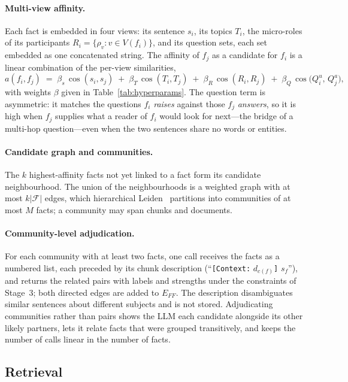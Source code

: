 \documentclass[runningheads]{llncs}
\newcommand{\Fset}{\mathcal{F}}
\newcommand{\Eff}{E_{FF}}
\newcommand{\cosim}{\operatorname{cos}}
\begin{document}
\paragraph{Multi-view affinity.}
Each fact is embedded in four views: its sentence $s_i$, its topics $T_i$, the micro-roles of its participants $R_i = \{\rho_v : v \in V(f_i)\}$, and its question sets, each set embedded as one concatenated string. The affinity of $f_j$ as a candidate for $f_i$ is a linear combination of the per-view similarities,
\[
  a(f_i, f_j) \;=\; \beta_s\, \cosim(s_i, s_j) \;+\; \beta_T\, \cosim(T_i, T_j) \;+\; \beta_R\, \cosim(R_i, R_j) \;+\; \beta_Q\, \cosim\bigl(Q^u_i,\, Q^a_j\bigr),
\]
with weights $\beta$ given in Table~\ref{tab:hyperparams}. The question term is asymmetric: it matches the questions $f_i$ \emph{raises} against those $f_j$ \emph{answers}, so it is high when $f_j$ supplies what a reader of $f_i$ would look for next---the bridge of a multi-hop question---even when the two sentences share no words or entities.

\paragraph{Candidate graph and communities.}
The $k$ highest-affinity facts not yet linked to a fact form its candidate neighbourhood. The union of the neighbourhoods is a weighted graph with at most $k|\Fset|$ edges, which hierarchical Leiden~\cite{traag2019leiden} partitions into communities of at most $M$ facts; a community may span chunks and documents.

\paragraph{Community-level adjudication.}
For each community with at least two facts, one call receives the facts as a numbered list, each preceded by its chunk description (``\texttt{[Context:} $d_{c(f)}$\texttt{]} $s_f$''), and returns the related pairs with labels and strengths under the constraints of Stage~3; both directed edges are added to $\Eff$. The description disambiguates similar sentences about different subjects and is not stored. Adjudicating communities rather than pairs shows the LLM each candidate alongside its other likely partners, lets it relate facts that were grouped transitively, and keeps the number of calls linear in the number of facts.

\subsection{Retrieval}
\label{sec:retrieval}
\end{document}
